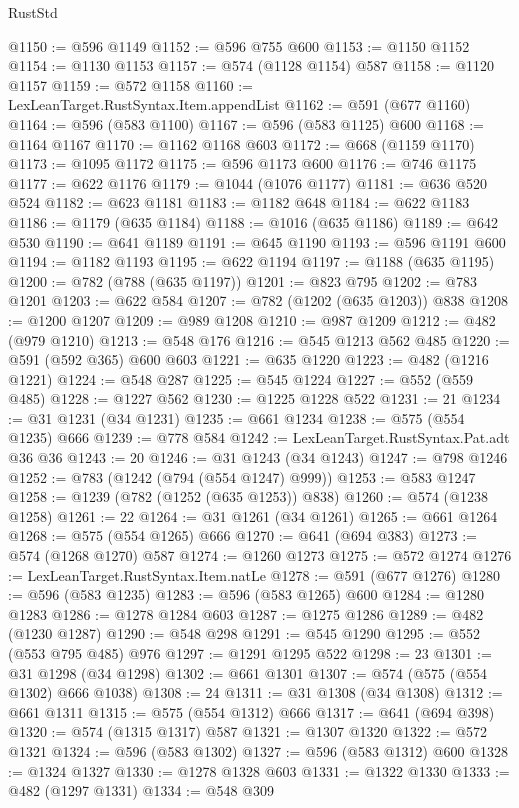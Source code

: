 \begin{lexlean}{RustStd}
\begin{coremodule}
@1150 := @596 @1149
@1152 := @596 @755 @600
@1153 := @1150 @1152
@1154 := @1130 @1153
@1157 := @574 (@1128 @1154) @587
@1158 := @1120 @1157
@1159 := @572 @1158
@1160 := LexLeanTarget.RustSyntax.Item.appendList
@1162 := @591 (@677 @1160)
@1164 := @596 (@583 @1100)
@1167 := @596 (@583 @1125) @600
@1168 := @1164 @1167
@1170 := @1162 @1168 @603
@1172 := @668 (@1159 @1170)
@1173 := @1095 @1172
@1175 := @596 @1173 @600
@1176 := @746 @1175
@1177 := @622 @1176
@1179 := @1044 (@1076 @1177)
@1181 := @636 @520 @524
@1182 := @623 @1181
@1183 := @1182 @648
@1184 := @622 @1183
@1186 := @1179 (@635 @1184)
@1188 := @1016 (@635 @1186)
@1189 := @642 @530
@1190 := @641 @1189
@1191 := @645 @1190
@1193 := @596 @1191 @600
@1194 := @1182 @1193
@1195 := @622 @1194
@1197 := @1188 (@635 @1195)
@1200 := @782 (@788 (@635 @1197))
@1201 := @823 @795
@1202 := @783 @1201
@1203 := @622 @584
@1207 := @782 (@1202 (@635 @1203)) @838
@1208 := @1200 @1207
@1209 := @989 @1208
@1210 := @987 @1209
@1212 := @482 (@979 @1210)
@1213 := @548 @176
@1216 := @545 @1213 @562 @485
@1220 := @591 (@592 @365) @600 @603
@1221 := @635 @1220
@1223 := @482 (@1216 @1221)
@1224 := @548 @287
@1225 := @545 @1224
@1227 := @552 (@559 @485)
@1228 := @1227 @562
@1230 := @1225 @1228 @522
@1231 := 21
@1234 := @31 @1231 (@34 @1231)
@1235 := @661 @1234
@1238 := @575 (@554 @1235) @666
@1239 := @778 @584
@1242 := LexLeanTarget.RustSyntax.Pat.adt @36 @36
@1243 := 20
@1246 := @31 @1243 (@34 @1243)
@1247 := @798 @1246
@1252 := @783 (@1242 (@794 (@554 @1247) @999))
@1253 := @583 @1247
@1258 := @1239 (@782 (@1252 (@635 @1253)) @838)
@1260 := @574 (@1238 @1258)
@1261 := 22
@1264 := @31 @1261 (@34 @1261)
@1265 := @661 @1264
@1268 := @575 (@554 @1265) @666
@1270 := @641 (@694 @383)
@1273 := @574 (@1268 @1270) @587
@1274 := @1260 @1273
@1275 := @572 @1274
@1276 := LexLeanTarget.RustSyntax.Item.natLe
@1278 := @591 (@677 @1276)
@1280 := @596 (@583 @1235)
@1283 := @596 (@583 @1265) @600
@1284 := @1280 @1283
@1286 := @1278 @1284 @603
@1287 := @1275 @1286
@1289 := @482 (@1230 @1287)
@1290 := @548 @298
@1291 := @545 @1290
@1295 := @552 (@553 @795 @485) @976
@1297 := @1291 @1295 @522
@1298 := 23
@1301 := @31 @1298 (@34 @1298)
@1302 := @661 @1301
@1307 := @574 (@575 (@554 @1302) @666 @1038)
@1308 := 24
@1311 := @31 @1308 (@34 @1308)
@1312 := @661 @1311
@1315 := @575 (@554 @1312) @666
@1317 := @641 (@694 @398)
@1320 := @574 (@1315 @1317) @587
@1321 := @1307 @1320
@1322 := @572 @1321
@1324 := @596 (@583 @1302)
@1327 := @596 (@583 @1312) @600
@1328 := @1324 @1327
@1330 := @1278 @1328 @603
@1331 := @1322 @1330
@1333 := @482 (@1297 @1331)
@1334 := @548 @309

\end{coremodule}
\end{lexlean}
